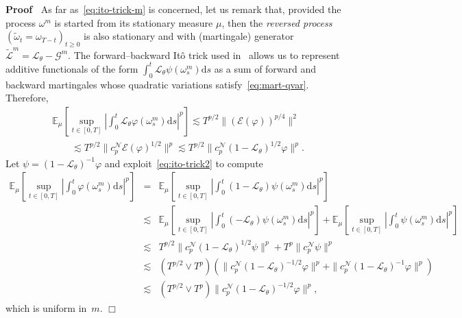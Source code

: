 \documentclass{article}
\newcommand{\mathd}{\mathrm{d}}
\newcommand{\tmtextit}[1]{{\itshape{#1}}}
\newenvironment{proof}{\noindent\textbf{Proof\ }}{\hspace*{\fill}$\Box$\medskip}
\begin{document}
\begin{proof}
  As far as~{\eqref{eq:ito-trick-m}} is concerned, let us remark that,
  provided the process $\omega^m$ is started from its stationary measure
  $\mu$, then the \tmtextit{reversed process} $(\tilde{\omega}_t = \omega_{T -
  t})_{t \geqslant 0}$ is also stationary and with (martingale) generator
  $\tilde{\mathcal{L}}^m =\mathcal{L}_{\theta} -\mathcal{G}^m$. The
  forward--backward It{\^o} trick used in~{\cite{gubinelli2013regularization}}
  allows us to represent additive functionals of the form $\int_0^t
  \mathcal{L}_{\theta} \psi (\omega_s^m) \mathd s$ as a sum of forward and
  backward martingales whose quadratic variations
  satisfy~{\eqref{eq:mart-qvar}}. Therefore,
  \begin{equation}
    \begin{array}{l}
      \mathbb{E}_{\mu} \left[ \sup_{t \in [0, T]} \left| \int_0^t
      \mathcal{L}_{\theta} \varphi (\omega_s^m) \mathd s \right|^p \right]
      \lesssim T^{p / 2} \| (\mathcal{E} (\varphi))^{p / 4} \|^2\\
      \qquad \lesssim T^{p / 2} \| c_p^{\mathcal{N}} \mathcal{E} (\varphi)^{1
      / 2} \|^p \lesssim T^{p / 2} \| c_p^{\mathcal{N}} (1
      -\mathcal{L}_{\theta})^{1 / 2} \varphi \|^p .
    \end{array} \label{eq:ito-trick2}
  \end{equation}
  Let $\psi = (1 -\mathcal{L}_{\theta})^{- 1} \varphi$ and
  exploit~{\eqref{eq:ito-trick2}} to compute
  \[ \begin{array}{lll}
       \mathbb{E}_{\mu} \left[ \sup_{t \in [0, T]} \left| \int_0^t \varphi
       (\omega_s^m) \mathd s \right|^p \right] & = & \mathbb{E}_{\mu} \left[
       \sup_{t \in [0, T]} \left| \int_0^t (1 -\mathcal{L}_{\theta}) \psi
       (\omega_s^m) \mathd s \right|^p \right]\\
       & \lesssim & \mathbb{E}_{\mu} \left[ \sup_{t \in [0, T]} \left|
       \int_0^t (-\mathcal{L}_{\theta}) \psi (\omega_s^m) \mathd s \right|^p
       \right] +\mathbb{E}_{\mu} \left[ \sup_{t \in [0, T]} \left| \int_0^t
       \psi (\omega_s^m) \mathd s \right|^p \right]\\
       & \lesssim & T^{p / 2} \| c_p^{\mathcal{N}} (1
       -\mathcal{L}_{\theta})^{1 / 2} \psi \|^p + T^p \| c_p^{\mathcal{N}}
       \psi \|^p\\
       & \lesssim & (T^{p / 2} \vee T^p) (\| c_p^{\mathcal{N}} (1
       -\mathcal{L}_{\theta})^{- 1 / 2} \varphi \|^p + \| c_p^{\mathcal{N}} (1
       -\mathcal{L}_{\theta})^{- 1} \varphi \|^p)\\
       & \lesssim & (T^{p / 2} \vee T^p) \| c_p^{\mathcal{N}} (1
       -\mathcal{L}_{\theta})^{- 1 / 2} \varphi \|^p,
     \end{array} \]
  which is uniform in~$m$.
\end{proof}
\end{document}
